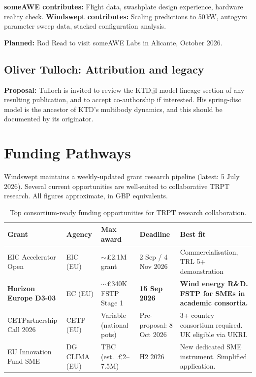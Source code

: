 \documentclass[11pt,a4paper]{article}
\begin{document}
\textbf{someAWE contributes:} Flight data, swashplate design experience, hardware reality check.
\textbf{Windswept contributes:} Scaling predictions to 50\,kW, autogyro parameter sweep data, stacked configuration analysis.

\textbf{Planned:} Rod Read to visit someAWE Labs in Alicante, October 2026.

\subsection{Oliver Tulloch: Attribution and legacy}

\textbf{Proposal:} Tulloch is invited to review the KTD.jl model lineage section of any resulting publication, and to accept co-authorship if interested.
His spring-disc model is the ancestor of KTD's multibody dynamics, and this should be documented by its originator.

\section{Funding Pathways}

Windswept maintains a weekly-updated grant research pipeline (latest: 5 July 2026).
Several current opportunities are well-suited to collaborative TRPT research.
All figures approximate, in GBP equivalents.

\begin{table}[htbp]
\centering
\caption{Top consortium-ready funding opportunities for TRPT research collaboration.}
\label{tab:funding}
\begin{tabular}{@{}p{2.2cm}p{2.2cm}p{2.5cm}p{2.0cm}p{2.8cm}@{}}
\toprule
Grant & Agency & Max award & Deadline & Best fit \\
\midrule
EIC Accelerator Open & EIC (EU) & $\sim$\pounds 2.1M grant & 2 Sep / 4 Nov 2026 & Commercialisation, TRL 5+ demonstration \\
\textbf{Horizon Europe D3-03} & EC (EU) & $\sim$\pounds 340K FSTP Stage 1 & \textbf{15 Sep 2026} & \textbf{Wind energy R\&D. FSTP for SMEs in academic consortia.} \\
CETPartnership Call 2026 & CETP (EU) & Variable (national pots) & Pre-proposal: 8 Oct 2026 & 3+ country consortium required. UK eligible via UKRI. \\
EU Innovation Fund SME & DG CLIMA (EU) & TBC (est.\ \pounds 2--7.5M) & H2 2026 & New dedicated SME instrument. Simplified application. \\
\bottomrule
\end{tabular}
\end{table}
\end{document}
